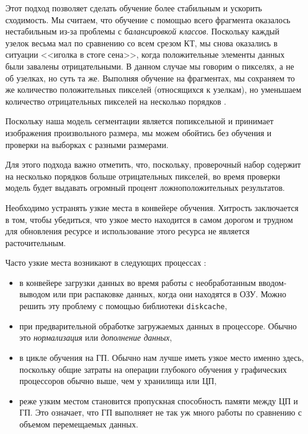 \documentclass[%
	11pt,
	a4paper,
	utf8,
		]{article}
\begin{document}
Этот подход позволяет сделать обучение более стабильным и ускорить сходимость. Мы считаем, что обучение с помощью всего фрагмента оказалось нестабильным из-за проблемы с \emph{балансировкой классов}. Поскольку каждый узелок весьма мал по сравнению со всем срезом КТ, мы снова оказались в ситуации <<иголка в стоге сена>>, когда положительные элементы данных были завалены отрицательными. В данном случае мы говорим о пикселях, а не об узелках, но суть та же. Выполняя обучение на фрагментах, мы сохраняем то же количество положительных пикселей (относящихся к узелкам), но уменьшаем количество отрицательных пикселей на несколько порядков \cite[]{pytorch-2022}.

Поскольку наша модель сегментации является попиксельной и принимает изображения произвольного размера, мы можем обойтись без обучения и проверки на выборках с разными размерами. 

Для этого подхода важно отметить, что, поскольку, проверочный набор содержит на несколько порядков больше отрицательных пикселей, во время проверки модель будет выдавать огромный процент ложноположительных результатов.

Необходимо устранять узкие места в конвейере обучения. Хитрость заключается в том, чтобы убедиться, что узкое место находится в самом дорогом и трудном для обновления ресурсе и использование этого ресурса не является расточительным.

Часто узкие места возникают в следующих процессах \cite[]{pytorch-2022}:
\begin{itemize}
	\item в конвейере загрузки данных во время работы с необработанным вводом-выводом или при распаковке данных, когда они находятся в ОЗУ. Можно решить эту проблему с помощью библиотеки \verb|diskcache|,
	
	\item при предварительной обработке загружаемых данных в процессоре. Обычно это \emph{нормализация} или \emph{дополнение данных},
	
	\item в цикле обучения на ГП. Обычно нам лучше иметь узкое место именно здесь, поскольку общие затраты на операции глубокого обучения у графических процессоров обычно выше, чем у хранилища или ЦП,
	
	\item реже узким местом становится пропускная способность памяти между ЦП и ГП. Это означает, что ГП выполняет не так уж много работы по сравнению с объемом перемещаемых данных.
\end{itemize}
\end{document}
